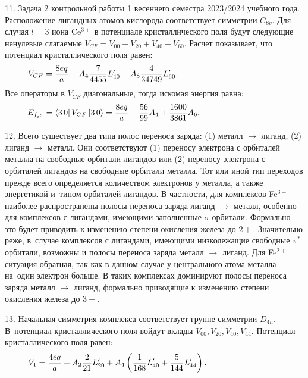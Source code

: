 11. Задача 2 контрольной работы 1 весеннего семестра 2023/2024 учебного года. Расположение лигандных атомов кислорода соответствует симметрии $C_{8v}$. Для случая $l=3$ иона Ce$^{3+}$ в потенциале кристаллического поля будут следующие ненулевые слагаемые $V_{CF}=V_{00}+V_{20}+V_{40}+V_{60}$. Расчет показывает, что потенциал кристаллического поля равен:
\begin{equation*}
\begin{aligned}
& V_{CF}= \dfrac{8eq}{a} - A_4 \dfrac{7}{4455}L_{40}' - A_6 \dfrac{4}{34749}L_{60}'. \hspace{40mm}
\end{aligned}
\end{equation*}
Все операторы в $V_{CF}$ диагональные, тогда искомая энергия равна: 
\begin{equation*}
\begin{aligned}
& E_{f_{z^3}}=\bra{3\,0} V_{CF} \ket{3\,0} =\dfrac{8eq}{a} -  \dfrac{56}{99}A_4 + \dfrac{1600}{3861}A_6. \hspace{31mm}
\end{aligned}
\end{equation*}\par 
12. Всего существует два типа полос переноса заряда: (1) металл $\rightarrow$ лиганд, (2) лиганд $\rightarrow$ металл. Они соответствуют (1) переносу электрона с орбиталей металла на свободные орбитали лигандов или (2) переносу электрона с орбиталей лигандов на свободные орбитали металла. Тот или иной тип переходов прежде всего определяется количеством электронов у металла, а также энергетикой и~типом орбиталей лигандов. В частности, для комплексов Fe$^{3+}$ наиболее распространены полосы переноса заряда лиганд $\rightarrow$ металл, особенно для комплексов с лигандами, имеющими заполненные $\sigma$ орбитали. Формально это будет приводить к изменению степени окисления железа до $2+$. Значительно реже, в~случае комплексов с лигандами, имеющими низколежащие свободные $\pi^*$ орбитали, возможны и полосы переноса заряда металл $\rightarrow$ лиганд. Для Fe$^{2+}$ ситуация обратная, так как в данном случае у центрального атома металла на~один электрон больше. В таких комплексах доминируют полосы переноса заряда металл $\rightarrow$ лиганд, формально приводящие к изменению степени окисления железа до $3+$.\par
13. Начальная симметрия комплекса соответствует группе симметрии $D_{4h}$. В~потенциал кристаллического поля войдут вклады $V_{00}, V_{20}, V_{40}, V_{44}$. Потенциал кристаллического поля равен:
\begin{equation*}
\begin{aligned}
& V_{1}= \dfrac{4eq}{a} + A_2 \dfrac{2}{21}L_{20}' + A_4 \left( \dfrac{1}{168}L_{40}'  + \dfrac{5}{144}L_{44}' \right). \hspace{28mm}
\end{aligned}
\end{equation*}
